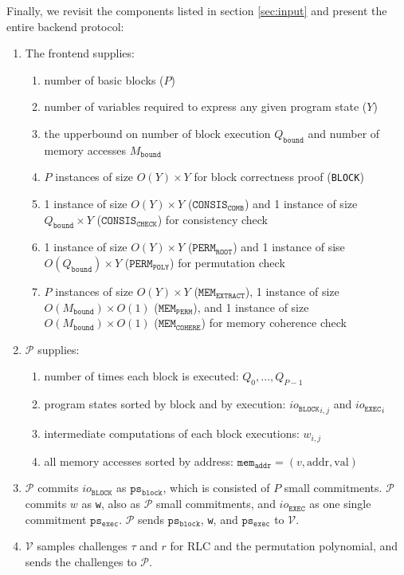 \documentclass{article}
\newcommand{\code}{\texttt}
\newcommand{\Qbound}{Q_{\mathtt{bound}}}
\newcommand{\Mbound}{M_{\mathtt{bound}}}
\renewcommand{\P}{\mathcal{P}}
\newcommand{\V}{\mathcal{V}}
\newcommand{\iob}{io_{\mathtt{BLOCK}}}
\newcommand{\ioe}{io_{\mathtt{EXEC}}}
\newcommand{\MEME}{\mathtt{MEM_{EXTRACT}}}
\newcommand{\MEMP}{\mathtt{MEM_{PERM}}}
\newcommand{\MEMC}{\mathtt{MEM_{COHERE}}}
\newcommand{\psb}{\mathtt{ps_{block}}}
\newcommand{\pse}{\mathtt{ps_{exec}}}
\newcommand{\mema}{\mathtt{mem_{addr}}}
\newcommand{\addr}{\mbox{addr}}
\newcommand{\val}{\mbox{val}}
\begin{document}
Finally, we revisit the components listed in section \ref{sec:input} and present the entire backend protocol:
\begin{enumerate}
    \item The frontend supplies:
    \begin{enumerate}
        \item number of basic blocks ($P$)
        \item number of variables required to express any given program state ($Y$)
        \item the upperbound on number of block execution $\Qbound$ and number of memory accesses $\Mbound$
        \item $P$ instances of size $O(Y)\times Y$ for block correctness proof (\code{BLOCK})
        \item 1 instance of size $O(Y) \times Y$ ($\mathtt{CONSIS}_\mathtt{COMB}$) and 1 instance of size $\Qbound \times Y$ ($\mathtt{CONSIS}_\mathtt{CHECK}$) for consistency check
        \item 1 instance of size $O(Y) \times Y$ ($\mathtt{PERM}_\mathtt{ROOT}$) and 1 instance of sise $O(\Qbound) \times Y$ ($\mathtt{PERM}_\mathtt{POLY}$) for permutation check
        \item $P$ instances of size $O(Y) \times Y$ ($\MEME$), 1 instance of size $O(\Mbound) \times O(1)$ ($\MEMP$), and 1 instance of size $O(\Mbound) \times O(1)$ ($\MEMC$) for memory coherence check
    \end{enumerate}
    \item $\P$ supplies:
    \begin{enumerate}
        \item number of times each block is executed: $Q_0, \dots, Q_{P - 1}$
        \item program states sorted by block and by execution: ${\iob}_{i, j}$ and ${\ioe}_i$
        \item intermediate computations of each block executions: $w_{i, j}$
        \item all memory accesses sorted by address: $\mema = (v, \addr, \val)$
    \end{enumerate}
    \item $\P$ commits $\iob$ as $\psb$, which is consisted of $P$ small commitments. $\P$ commits $w$ as \code{w}, also as $\P$ small commitments, and $\ioe$ as one single commitment $\pse$. $\P$ sends $\psb$, \code{w}, and $\pse$ to $\V$.
    \item $\V$ samples challenges $\tau$ and $r$ for RLC and the permutation polynomial, and sends the challenges to $\P$.

\end{enumerate}
\end{document}
